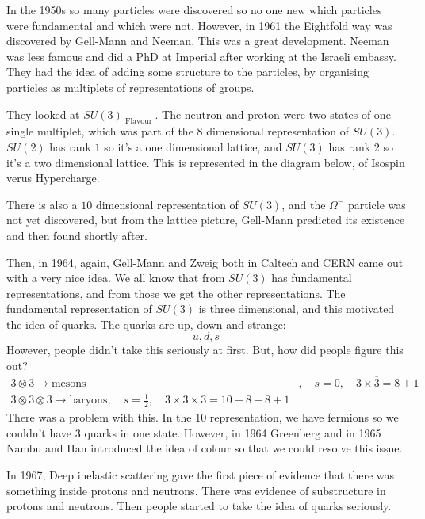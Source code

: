 \documentclass[11pt, oneside]{article}   	%
\theoremstyle{slanted}
\begin{document}
In the 1950s 
so many particles were discovered so no one 
new which particles were fundamental and which 
were not. 
However, in 1961 the Eightfold way 
was discovered by Gell-Mann and Neeman.  
This was a great development. 
Neeman was less famous and did a PhD at 
Imperial after working at the Israeli embassy. 
They had the idea of adding some structure to 
the particles, by organising particles 
as multiplets of representations of 
groups. 

They looked at $ SU ( 3 ) _{ \text{ Flavour } } $. 
The neutron and proton were two states 
of one single multiplet, which 
was part of the 
8 dimensional representation 
of $ SU ( 3 ) $. 
$ SU ( 2 ) $ has rank $ 1  $ 
so it's a one dimensional lattice, 
and $ SU ( 3 ) $ has rank $ 2 $ so it's 
a two dimensional lattice. 
This is represented 
in the diagram below, 
of Isospin verus Hypercharge. 

There is also a $ 10 $ dimensional 
representation of $ SU ( 3 ) $, 
and the $ \Omega^  - $ particle 
was not yet discovered, but 
from the lattice picture, 
Gell-Mann predicted its existence 
and then found shortly after. 


Then, in 1964, again, Gell-Mann and 
Zweig both in Caltech and CERN 
came out with a very nice idea. 
We all know that from $ SU ( 3 ) $
has fundamental representations, 
and from those we get the other 
representations. The fundamental 
representation of $ SU ( 3 ) $ 
is three dimensional, and this motivated 
the idea of quarks. 
The quarks are up, down and strange: 
\[
 u , d, s 
\] 
However, people didn't 
take this seriously at first. 
But, how did people figure this out? 
\begin{align*}
	3 \otimes 3 \to \text{mesons} & , \quad s = 0, \quad 
	3 \times \overline{ 3 }  = 8 + 1 \\
	3 \otimes 3 \otimes 3 \to \text{baryons}, \quad 
	s = \frac{1}{2 }, \quad 3 \times 3 \times 3  = 
	10 + 8 + 8 + 1 
\end{align*}
There was a problem with this. In the 10 representation, 
we have fermions so we couldn't have 
3 quarks in one state. 
However, in 1964 Greenberg and in 1965 Nambu and Han 
introduced the idea of colour so that 
we could resolve this issue. 

In 1967, Deep inelastic 
scattering gave the first piece of 
evidence that there 
was something inside protons and neutrons. 
There was evidence of substructure in protons and neutrons. 
Then people started to take the 
idea of quarks seriously. 
\end{document}
